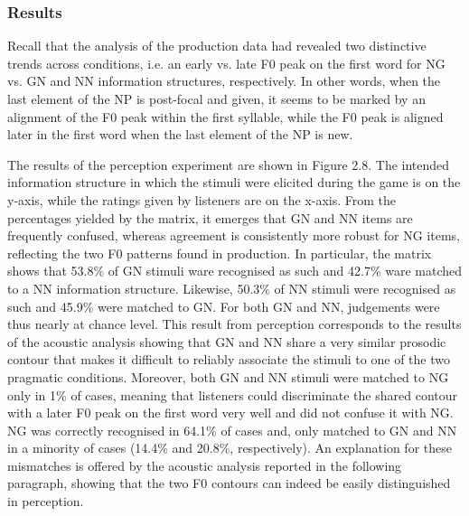\subsubsection{Results}
\hypertarget{Toc191305902}{}\begin{styleStandard}
Recall that the analysis of the production data had revealed two distinctive trends across conditions, i.e. an early vs. late F0 peak on the first word for NG vs. GN and NN information structures, respectively. In other words, when the last element of the NP is post-focal and given, it seems to be marked by an alignment of the F0 peak within the first syllable, while the F0 peak is aligned later in the first word when the last element of the NP is new.
\end{styleStandard}

\begin{styleStandard}
The results of the perception experiment are shown in Figure 2.8. The intended information structure in which the stimuli were elicited during the game is on the y-axis, while the ratings given by listeners are on the x-axis. From the percentages yielded by the matrix, it emerges that GN and NN items are frequently confused, whereas agreement is consistently more robust for NG items, reflecting the two F0 patterns found in production. In particular, the matrix shows that 53.8\% of GN stimuli ware recognised as such and 42.7\% ware matched to a NN information structure. Likewise, 50.3\% of NN stimuli were recognised as such and 45.9\% were matched to GN. For both GN and NN, judgements were thus nearly at chance level. This result from perception corresponds to the results of the acoustic analysis showing that GN and NN share a very similar prosodic contour that makes it difficult to reliably associate the stimuli to one of the two pragmatic conditions. Moreover, both GN and NN stimuli were matched to NG only in 1\% of cases, meaning that listeners could discriminate the shared contour with a later F0 peak on the first word very well and did not confuse it with NG. NG was correctly recognised in 64.1\% of cases and, only matched to GN and NN in a minority of cases (14.4\% and 20.8\%, respectively). An explanation for these mismatches is offered by the acoustic analysis reported in the following paragraph, showing that the two F0 contours can indeed be easily distinguished in perception.
\end{styleStandard}

\begin{styleStandard}
  [Warning: Image ignored] %
 
\end{styleStandard}

